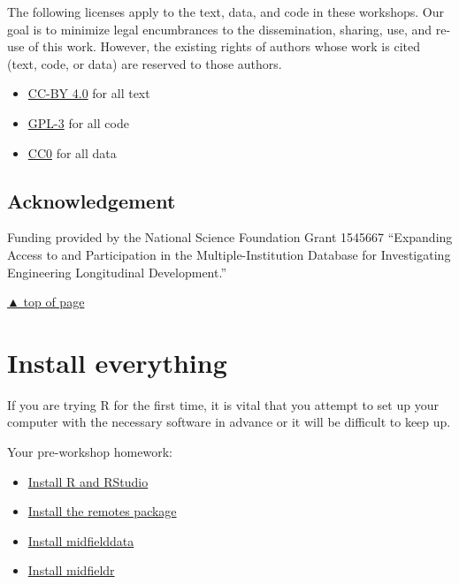 \documentclass[
]{book}
\providecommand{\tightlist}{%
  \setlength{\itemsep}{0pt}\setlength{\parskip}{0pt}}
\begin{document}
The following licenses apply to the text, data, and code in these workshops. Our goal is to minimize legal encumbrances to the dissemination, sharing, use, and re-use of this work. However, the existing rights of authors whose work is cited (text, code, or data) are reserved to those authors.

\begin{itemize}
\tightlist
\item
  \href{https://creativecommons.org/licenses/by/4.0/legalcode}{CC-BY 4.0} for all text\\
\item
  \href{https://www.r-project.org/Licenses/GPL-3}{GPL-3} for all code\\
\item
  \href{https://wiki.creativecommons.org/wiki/CC0_use_for_data}{CC0} for all data
\end{itemize}

\hypertarget{acknowledgement}{%
\section*{Acknowledgement}\label{acknowledgement}}

Funding provided by the National Science Foundation Grant 1545667 ``Expanding Access to and Participation in the Multiple-Institution Database for Investigating Engineering Longitudinal Development.''

\protect\hyperlink{introduction}{▲ top of page}

\hypertarget{install-everything}{%
\chapter{Install everything}\label{install-everything}}

If you are trying R for the first time, it is vital that you attempt to set up your computer with the necessary software in advance or it will be difficult to keep up.

Your pre-workshop homework:

\begin{itemize}
\tightlist
\item
  \protect\hyperlink{install-r-and-rstudio}{Install R and RStudio}
\item
  \protect\hyperlink{install-the-remotes-package}{Install the remotes package}
\item
  \protect\hyperlink{install-midfielddata}{Install midfielddata}
\item
  \protect\hyperlink{install-midfieldr}{Install midfieldr}
\end{itemize}
\end{document}
